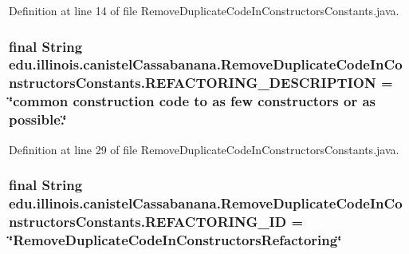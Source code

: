 Definition at line 14 of file RemoveDuplicateCodeInConstructorsConstants.java.

\hypertarget{classedu_1_1illinois_1_1canistelCassabanana_1_1RemoveDuplicateCodeInConstructorsConstants_abc82ec73939a90527fd8d564f097cef2}{
\subsubsection[{REFACTORING\_\-DESCRIPTION}]{\setlength{\rightskip}{0pt plus 5cm}final String {\bf edu.illinois.canistelCassabanana.RemoveDuplicateCodeInConstructorsConstants.REFACTORING\_\-DESCRIPTION} = \char`\"{}common construction code to as few constructors or as possible.\char`\"{}}}
\label{classedu_1_1illinois_1_1canistelCassabanana_1_1RemoveDuplicateCodeInConstructorsConstants_abc82ec73939a90527fd8d564f097cef2}


Definition at line 29 of file RemoveDuplicateCodeInConstructorsConstants.java.

\hypertarget{classedu_1_1illinois_1_1canistelCassabanana_1_1RemoveDuplicateCodeInConstructorsConstants_a9ec775251440faa08c5106486ba0cfee}{
\subsubsection[{REFACTORING\_\-ID}]{\setlength{\rightskip}{0pt plus 5cm}final String {\bf edu.illinois.canistelCassabanana.RemoveDuplicateCodeInConstructorsConstants.REFACTORING\_\-ID} = \char`\"{}RemoveDuplicateCodeInConstructorsRefactoring\char`\"{}}}
\label{classedu_1_1illinois_1_1canistelCassabanana_1_1RemoveDuplicateCodeInConstructorsConstants_a9ec775251440faa08c5106486ba0cfee}


